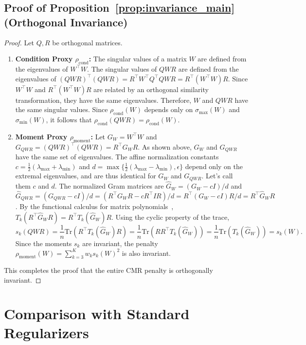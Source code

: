 \documentclass{opt2025}
\newcommand{\Tr}{\mathrm{Tr}}
\newcommand{\Ghat}{\widehat{G}}
\newcommand{\cmr}{\textsc{CMR}\xspace}
\begin{document}
\subsection{Proof of Proposition~\ref{prop:invariance_main} (Orthogonal Invariance)}
\begin{proof}
Let $Q, R$ be orthogonal matrices.
\begin{enumerate}
    \item \textbf{Condition Proxy $\rho_{\text{cond}}$:} The singular values of a matrix $W$ are defined from the eigenvalues of $W^\top W$. The singular values of $QWR$ are defined from the eigenvalues of $(QWR)^\top(QWR) = R^\top W^\top Q^\top Q W R = R^\top(W^\top W)R$. Since $W^\top W$ and $R^\top(W^\top W)R$ are related by an orthogonal similarity transformation, they have the same eigenvalues. Therefore, $W$ and $QWR$ have the same singular values. Since $\rho_{\text{cond}}(W)$ depends only on $\sigma_{\max}(W)$ and $\sigma_{\min}(W)$, it follows that $\rho_{\text{cond}}(QWR)=\rho_{\text{cond}}(W)$.
    \item \textbf{Moment Proxy $\rho_{\text{moment}}$:} Let $G_W = W^\top W$ and $G_{QWR} = (QWR)^\top(QWR) = R^\top G_W R$. As shown above, $G_W$ and $G_{QWR}$ have the same set of eigenvalues.
    The affine normalization constants $c = \frac{1}{2}(\lambda_{\max}+\lambda_{\min})$ and $d = \max\{\frac{1}{2}(\lambda_{\max}-\lambda_{\min}),\epsilon\}$ depend only on the extremal eigenvalues, and are thus identical for $G_W$ and $G_{QWR}$. Let's call them $c$ and $d$.
    The normalized Gram matrices are $\Ghat_W = (G_W - cI)/d$ and $\Ghat_{QWR} = (G_{QWR} - cI)/d = (R^\top G_W R - cR^\top I R)/d = R^\top (G_W - cI) R / d = R^\top \Ghat_W R$.
    By the functional calculus for matrix polynomials~\citep[Chap.~1]{Higham2008}, $T_k(R^\top \Ghat_W R) = R^\top T_k(\Ghat_W) R$.
    Using the cyclic property of the trace,
    \[
    s_k(QWR) = \frac{1}{n}\Tr(R^\top T_k(\Ghat_W) R) = \frac{1}{n}\Tr(R R^\top T_k(\Ghat_W)) = \frac{1}{n}\Tr(T_k(\Ghat_W)) = s_k(W).
    \]
    Since the moments $s_k$ are invariant, the penalty $\rho_{\text{moment}}(W) = \sum_{k=3}^K w_k s_k(W)^2$ is also invariant.
\end{enumerate}
This completes the proof that the entire \cmr penalty is orthogonally invariant.
\end{proof}
\section{Comparison with Standard Regularizers}
\label{app:standard_baselines}
\end{document}
